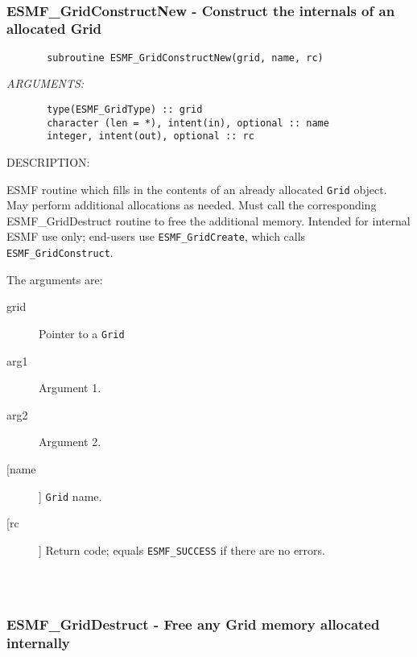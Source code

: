 {%
 
\mbox{}\hrulefill\ 
 
\subsubsection{ESMF\_GridConstructNew - Construct the internals of an allocated Grid}


 
\begin{verbatim}       subroutine ESMF_GridConstructNew(grid, name, rc)\end{verbatim}{\em ARGUMENTS:}
\begin{verbatim}       type(ESMF_GridType) :: grid 
       character (len = *), intent(in), optional :: name  
       integer, intent(out), optional :: rc\end{verbatim}
{\sf DESCRIPTION:\\ }


       ESMF routine which fills in the contents of an already
       allocated {\tt Grid} object.  May perform additional allocations
       as needed.  Must call the corresponding ESMF\_GridDestruct
       routine to free the additional memory.  Intended for internal
       ESMF use only; end-users use {\tt ESMF\_GridCreate}, which calls
       {\tt ESMF\_GridConstruct}. 
  
       The arguments are:
       \begin{description}
       \item[grid] 
            Pointer to a {\tt Grid}
       \item[arg1]
            Argument 1.
       \item[arg2]
            Argument 2.         
       \item[[name]] 
            {\tt Grid} name.
       \item[[rc]] 
            Return code; equals {\tt ESMF\_SUCCESS} if there are no errors.
       \end{description}
  
\begin{verbatim} \end{verbatim}
 
 
\mbox{}\hrulefill\ 
 
\subsubsection{ESMF\_GridDestruct - Free any Grid memory allocated internally}


}
